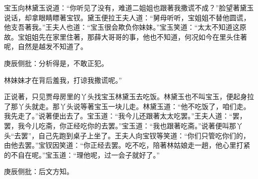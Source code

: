 \begin{parag}
    宝玉向林黛玉说道：“你听见了没有，难道二姐姐也跟著我撒谎不成？”脸望著黛玉说话，却拿眼睛瞟著宝钗。黛玉便拉王夫人道：“舅母听听，宝姐姐不替他圆谎，他支吾著我。”王夫人也道：“宝玉很会欺负你妹妹。”宝玉笑道：“太太不知道这原故。宝姐姐先在家里住著，那薛大哥哥的事，他也不知道，何况如今在里头住著呢，自然是越发不知道了。\begin{note}庚辰侧批：分析得是，不敢正犯。\end{note}林妹妹才在背后羞我，打谅我撒谎呢。”
\end{parag}


\begin{parag}
    正说著，只见贾母房里的丫头找宝玉林黛玉去吃饭。林黛玉也不叫宝玉，便起身拉了那丫头就走。那丫头说等著宝玉一块儿走。林黛玉道：“他不吃饭了，咱们走。我先走了。”说著便出去了。宝玉道：“我今儿还跟著太太吃罢。”王夫人道：“罢，罢，我今儿吃斋，你正经吃你的去罢。”宝玉道：“我也跟著吃斋。”说著便叫那丫头“去罢”，自己先跑到桌子上坐了。王夫人向宝钗等笑道：“你们只管吃你们的，由他去罢。”宝钗因笑道：“你正经去罢。吃不吃，陪著林姑娘走一趟，他心里打紧的不自在呢。”宝玉道：“理他呢，过一会子就好了。”\begin{note}庚辰侧批：后文方知。\end{note}
\end{parag}


